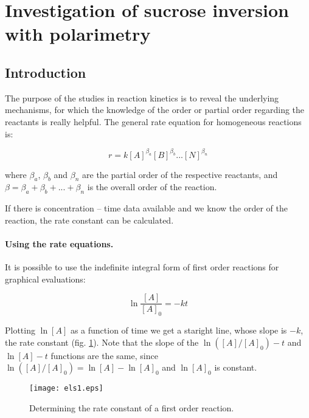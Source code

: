 \fancyhead[LO,RE]{\thesection}
\fancyfoot[LE,RO]{\thepage}

\section{Investigation of sucrose inversion with polarimetry}
\subsection{Introduction}
The purpose of the studies in reaction kinetics is to reveal the underlying mechanisms, for which the knowledge of the order or partial order regarding the reactants is really helpful.
The general rate equation for homogeneous reactions is:

\begin{equation}
\label{eq:general}
	r
	=
	k[A]^{\beta_a}[B]^{\beta_b}...[N]^{\beta_n}
\end{equation}

where $\beta_a$, $\beta_b$ and $\beta_n$ are the partial order of the respective reactants, and $\beta = \beta_a + \beta_b + ... + \beta_n$ is the overall order of the reaction.

If there is concentration -- time data available and we know the order of the reaction, the rate constant can be calculated.

\paragraph{Using the rate equations.}
It is possible to use the indefinite integral form of first order reactions for graphical evaluations:

\begin{equation}
\label{eq:2}
	\ln 
	\frac{[A]}{[A]_0}
	=
	- k
	t
\end{equation}

Plotting $\ln [A]$ as a function of time we get a staright line, whose slope is $-k$, the rate constant (fig. \ref{fig:els_1}). Note that the slope of the $\ln ([A]/[A]_0) - t$ and $\ln [A] - t$ functions are the same, since $\ln ([A]/[A]_0) = \ln [A] - \ln [A]_0$ and $\ln [A]_0$ is constant.

\begin{figure}[b]
\centering
\texttt{[image: els1.eps]}
\caption{Determining the rate constant of a first order reaction.}
\label{fig:els_1}
\end{figure}

